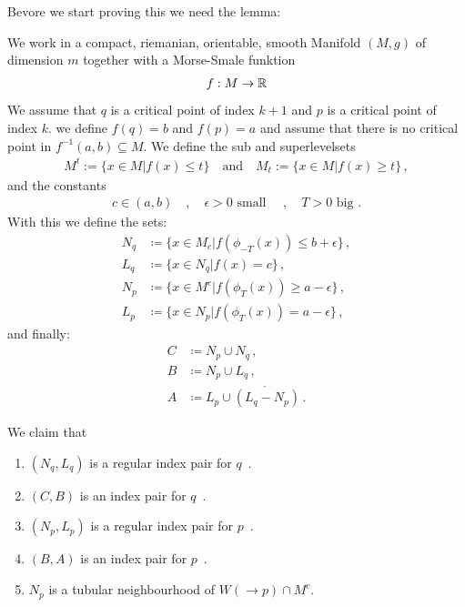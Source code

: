Bevore we start proving this we need the lemma: 

\begin{lemma}\label{lem: The Main Lemma Np is tubular}
	We work in a compact, riemanian, orientable, smooth Manifold $(M,g)$ of dimension $m$ together with a Morse-Smale funktion 
	\begin{align}
		f: M\to \mathbb{R}
	\end{align}
	We assume that $q$ is a critical point of index $k+1$ and $p$ is a critical point of index $k$. we define $f(q)=b$ and $f(p)=a$ and assume that there is no critical point in $f^{-1}(a,b)\subseteq M$. We define the sub and superlevelsets 
	\begin{align}
		M^t:=\{ x\in M | f(x)\leq t \} \quad \text{and}\quad M_t:=\{ x\in M | f(x)\geq t \} \, ,
	\end{align} and the constants 
	\begin{align}
		c \in (a,b) \quad , \quad \epsilon >0 \text{ small } \quad,\quad T>0 \text{ big .}
	\end{align} With this we define the sets: 
	\begin{align}
		N_q  & \coloneq    \{ x\in M_c |f(\phi_{-T}(x))  \leq b+ \epsilon  \}   \, ,  \\
		L_q  & \coloneq    \{ x\in N_q |f(x)             =    c            \}    \, , \\
		N_p  & \coloneq    \{ x\in M^c |f(\phi_T(x))     \geq a-\epsilon   \}    \, , \\
		L_p  & \coloneq    \{ x\in N_p |f( \phi_T(x))    =    a-\epsilon   \} \, ,
	\end{align} and finally: 
	\begin{align}
		C  & \coloneq  N_p \cup N_q  \, ,                     \\
		B  & \coloneq  N_p \cup L_q   \, ,                   \\
		A  & \coloneq  L_p \cup \mathring{(L_q-N_p)} \, .
	\end{align}
	
	We claim that 
	\begin{enumerate}
		\item $(N_q,L_q)$ is a regular index pair for $q$\, . \label{lem: enum: 1}
		\item $(C,B)$ is an index pair for $q$\, .\label{lem: enum: 2}
		\item $(N_p,L_p)$ is a regular index pair for $p$\, .\label{lem: enum: 3}
		\item $(B,A)$ is an index pair for $p$\, .\label{lem: enum: 4}
		\item $N_p$ is a tubular neighbourhood of $W(\to p)\cap M^c$.\label{lem: enum: 5}
	\end{enumerate}
\end{lemma}

